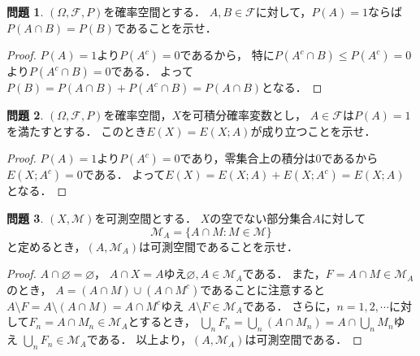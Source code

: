\documentclass{jsarticle}
\theoremstyle{definition}
\newtheorem{qst}{問題}
\begin{document}
\begin{qst}
$(\Omega,\mathcal{F},P)$を確率空間とする．
$A,B\in\mathcal{F}$に対して，$P(A)=1$ならば$P(A\cap B)=P(B)$であることを示せ．
\end{qst}
\begin{proof}
$P(A)=1$より$P(A^c)=0$であるから，
特に$P(A^c\cap B)\leq P(A^c)=0$より$P(A^c\cap B)=0$である．
よって$P(B)=P(A\cap B)+P(A^c\cap B)=P(A\cap B)$となる．
\end{proof}

\begin{qst}
$(\Omega,\mathcal{F},P)$を確率空間，$X$を可積分確率変数とし，
$A\in\mathcal{F}$は$P(A)=1$を満たすとする．
このとき$E(X)=E(X;A)$が成り立つことを示せ．
\end{qst}
\begin{proof}
$P(A)=1$より$P(A^c)=0$であり，零集合上の積分は0であるから$E(X;A^c)=0$である．
よって$E(X)=E(X;A)+E(X;A^c)=E(X;A)$となる．
\end{proof}

\begin{qst}
$(X,\mathcal{M})$を可測空間とする．
$X$の空でない部分集合$A$に対して
\[ \mathcal{M}_A=\{A\cap M:M\in\mathcal{M}\} \]
と定めるとき，$(A,\mathcal{M}_A)$は可測空間であることを示せ．
\end{qst}
\begin{proof}
$A\cap\varnothing=\varnothing$，
$A\cap X=A$ゆえ$\varnothing,A\in\mathcal{M}_A$である．
また，$F=A\cap M\in\mathcal{M}_A$のとき，
$A=(A\cap M)\cup(A\cap M^c)$であることに注意すると
$A\setminus F=A\setminus(A\cap M)=A\cap M^c$ゆえ
$A\setminus F\in\mathcal{M}_A$である．
さらに，$n=1,2,\cdots$に対して$F_n=A\cap M_n\in\mathcal{M}_A$とするとき，
$\bigcup_nF_n=\bigcup_n(A\cap M_n)=A\cap\bigcup_nM_n$ゆえ
$\bigcup_nF_n\in\mathcal{M}_A$である．
以上より，$(A,\mathcal{M}_A)$は可測空間である．
\end{proof}
\end{document}
